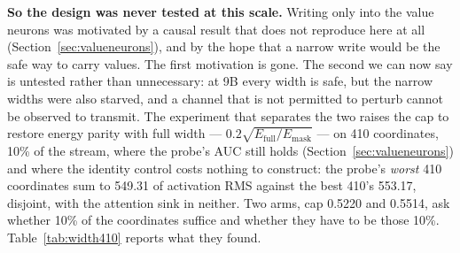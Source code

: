 \documentclass[11pt]{article}
\begin{document}
\textbf{So the design was never tested at this scale.} Writing only into the value neurons was motivated by a causal result that does not reproduce here at all (Section~\ref{sec:valueneurons}), and by the hope that a narrow write would be the safe way to carry values. The first motivation is gone. The second we can now say is untested rather than unnecessary: at 9B every width is safe, but the narrow widths were also starved, and a channel that is not permitted to perturb cannot be observed to transmit. The experiment that separates the two raises the cap to restore energy parity with full width --- $0.2\sqrt{E_{\mathrm{full}}/E_{\mathrm{mask}}}$ --- on 410 coordinates, 10\% of the stream, where the probe's AUC still holds (Section~\ref{sec:valueneurons}) and where the identity control costs nothing to construct: the probe's \emph{worst} 410 coordinates sum to 549.31 of activation RMS against the best 410's 553.17, disjoint, with the attention sink in neither. Two arms, cap 0.5220 and 0.5514, ask whether 10\% of the coordinates suffice and whether they have to be those 10\%. Table~\ref{tab:width410} reports what they found.
\end{document}
